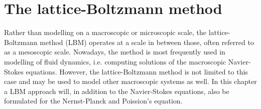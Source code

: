 \chapter{The lattice-Boltzmann method}\label{sec:lbm}
Rather than modelling on a macroscopic or microscopic scale, the
lattice-Boltzmann method (LBM) operates at a scale in between those,
often referred to as a mesoscopic scale. Nowadays, the method is most
frequently used in modelling of fluid dynamics, i.e. computing
solutions of the macroscopic Navier-Stokes equations. However, the
lattice-Boltzmann method is not limited to this case and may be used
to model other macroscopic systems as well. In this chapter a LBM
approach will, in addition to the Navier-Stokes equations, also be
formulated for the Nernst-Planck and Poission's equation.




























